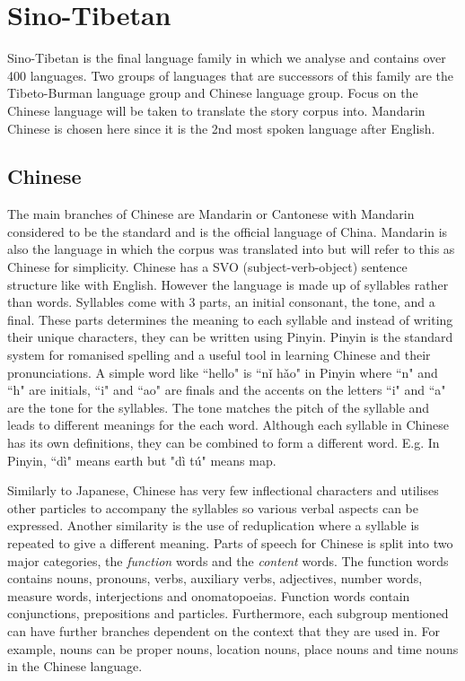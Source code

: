 \section{Sino-Tibetan}
Sino-Tibetan is the final language family in which we analyse and contains over 400 languages. Two groups of languages that are successors of this family are the Tibeto-Burman language group and Chinese language group. Focus on the Chinese language will be taken to translate the story corpus into. Mandarin Chinese is chosen here since it is the 2nd most spoken language after English.

\subsection{Chinese}
The main branches of Chinese are Mandarin or Cantonese with Mandarin considered to be the standard and is the official language of China. Mandarin is also the language in which the corpus was translated into but will refer to this as Chinese for simplicity. Chinese has a SVO (subject-verb-object) sentence structure like with English. However the language is made up of syllables \cite{ross2017modern} rather than words. Syllables come with 3 parts, an initial consonant, the tone, and a final. These parts determines the meaning to each syllable and instead of writing their unique characters, they can be written using Pinyin. Pinyin is the standard system for romanised spelling and a useful tool in learning Chinese and their pronunciations. A simple word like ``hello" is ``nǐ hǎo" in Pinyin where ``n" and ``h" are initials, ``i" and ``ao" are finals and the accents on the letters ``i" and ``a" are the tone for the syllables. The tone matches the pitch of the syllable and leads to different meanings for the each word. Although each syllable in Chinese has its own definitions, they can be combined to form a different word. E.g. In Pinyin, ``dì" means earth but "dì tú" means map.

Similarly to Japanese, Chinese has very few inflectional characters and utilises other particles to accompany the syllables so various verbal aspects can be expressed. Another similarity is the use of reduplication where a syllable is repeated to give a different meaning. Parts of speech for Chinese is split into two major categories, the \emph{function} words and the \emph{content} words. The function words contains nouns, pronouns, verbs, auxiliary verbs, adjectives, number words, measure words, interjections and onomatopoeias. Function words contain conjunctions, prepositions and particles. Furthermore, each subgroup mentioned can have further branches dependent on the context that they are used in. For example, nouns can be proper nouns, location nouns, place nouns and time nouns in the Chinese language.

